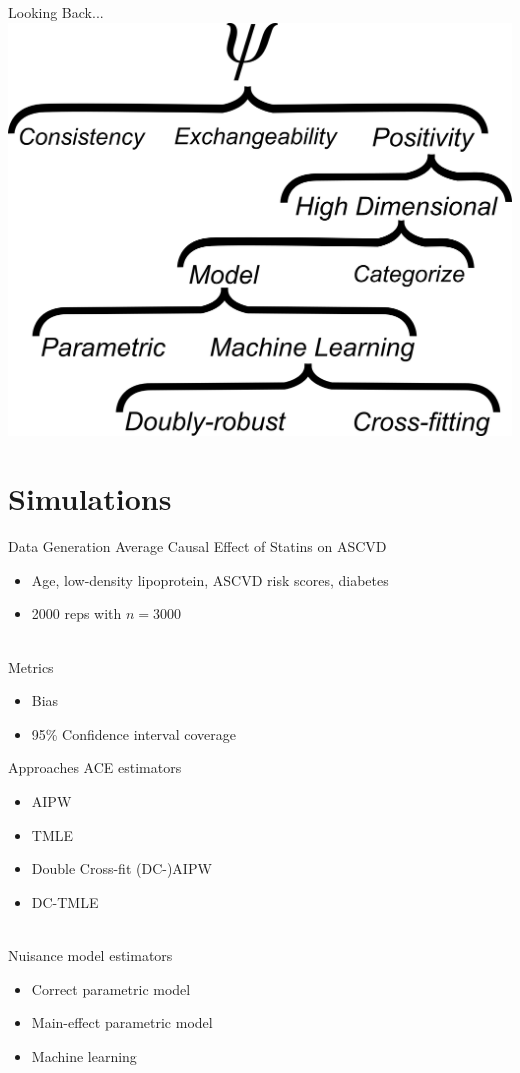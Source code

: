 \documentclass{beamer}
\begin{document}
\begin{frame}{Looking Back...}
	\centering
	\includegraphics[scale=0.54]{images/tree_travel.png}
\end{frame}

\section{Simulations}

\begin{frame}{Data Generation}
	Average Causal Effect of Statins on ASCVD
	\begin{itemize}
		\item Age, low-density lipoprotein, ASCVD risk scores, diabetes
		\item 2000 reps with $n=3000$
	\end{itemize}~\\
	Metrics
	\begin{itemize}
		\item Bias
		\item 95\% Confidence interval coverage
	\end{itemize}
\end{frame}

\begin{frame}{Approaches}
	ACE estimators
	\begin{itemize}
		\item AIPW
		\item TMLE
		\item Double Cross-fit (DC-)AIPW
		\item DC-TMLE
	\end{itemize}~\\
	Nuisance model estimators
	\begin{itemize}
		\item Correct parametric model
		\item Main-effect parametric model
		\item Machine learning
	\end{itemize}
\end{frame}
\end{document}
